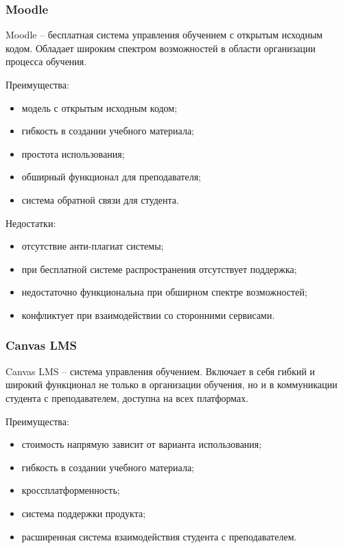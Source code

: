 \subsubsection{Moodle}

Moodle\cite{moodle} -- бесплатная система управления обучением с открытым исходным кодом. Обладает широким спектром возможностей в области организации процесса обучения.

Преимущества:
\begin{itemize}
	\item модель с открытым исходным кодом;
	\item гибкость в создании учебного материала;
	\item простота использования;
	\item обширный функционал для преподавателя;
	\item система обратной связи для студента.
\end{itemize}

Недостатки:
\begin{itemize}
	\item отсутствие анти-плагиат системы;
	\item при бесплатной системе распространения отсутствует поддержка;
	\item недостаточно функциональна при обширном спектре возможностей;
	\item конфликтует при взаимодействии со сторонними сервисами.
\end{itemize}

\subsubsection{Canvas LMS}

Canvas LMS\cite{canvas-lms} -- система управления обучением. Включает в себя гибкий и широкий функционал не только в организации обучения, но и в коммуникации студента с преподавателем, доступна на всех платформах. 

Преимущества:
\begin{itemize}
	\item стоимость напрямую зависит от варианта использования;
	\item гибкость в создании учебного материала;
	\item кроссплатформенность;
	\item система поддержки продукта;
	\item расширенная система взаимодействия студента с преподавателем.
\end{itemize}

